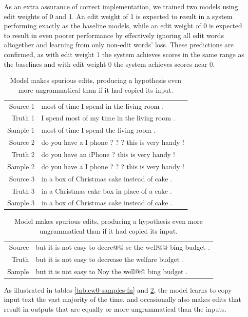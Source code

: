 As an extra assurance of correct implementation, we trained two models using edit weights of 0 and 1. An edit weight of 1 is expected to result in a system performing exactly as the baseline models, while an edit weight of 0 is expected to result in even poorer performance by effectively ignoring all edit words altogether and learning from only non-edit words' loss. These predictions are confirmed, as with edit weight 1 the system achieves scores in the same range as the baselines and with edit weight 0 the system achieves scores near 0.

\begin{table}[h]
\centering
\begin{tabular}{ r l }
\tabularnewline \hline \hline
Source 1 & most of time I spend in the living room . \\
Truth 1 & I spend most of my time in the living room . \\
Sample 1 & most of time I spend the living room . \\ \hline
Source 2 & do you have a I phone ? ? ? this is very handy ! \\
Truth 2 & do you have an iPhone ? this is very handy ! \\
Sample 2 & do you have a I phone ? ? ? this is very handy ! \\ \hline
Source 3 & in a box of Christmas cake instead of cake . \\
Truth 3 & in a Christmas cake box in place of a cake . \\
Sample 3 & in a box of Christmas cake instead of cake . \\ \hline
\end{tabular}
\caption{Model copies input without correcting grammatical errors (false negatives).} \label{tab:ew0-samples-fn}
\begin{tabular}{ r l }
\tabularnewline \hline \hline
Source & but it is not easy to decre@@ se the well@@ bing budget . \\
Truth & but it is not easy to decrease the welfare budget . \\
Sample & but it is not easy to Noy the well@@ bing budget . \\ \hline
\end{tabular}
\caption{Model makes spurious edits, producing a hypothesis even more ungrammatical than if it had copied its input.} \label{tab:ew0-samples-fp}
\end{table}

As illustrated in tables \ref{tab:ew0-samples-fn} and \ref{tab:ew0-samples-fp}, the model learns to copy input text the vast majority of the time, and occasionally also makes edits that result in outputs that are equally or more ungrammatical than the inputs.

